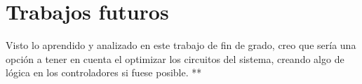 \documentclass[a4paper, 12pt]{book}
\begin{document}
	
	\section{Trabajos futuros}
	\label{sec:trabajos_futuros}
	
	Visto lo aprendido y analizado en este trabajo de fin de grado, creo que sería una opción a tener en cuenta el optimizar los circuitos del sistema, creando algo de lógica en los controladores si fuese posible. **
	
	
	
	\cleardoublepage
	
	
	\cleardoublepage
	
	
	
\end{document}
